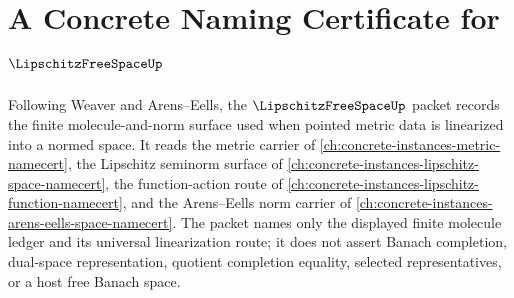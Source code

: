\chapter{A Concrete Naming Certificate for $\LipschitzFreeSpaceUp$}
\label{ch:concrete-instances-lipschitz-free-space-namecert}

Following Weaver and Arens--Eells, the $\LipschitzFreeSpaceUp$ packet records the finite molecule-and-norm surface used when pointed metric data is linearized into a normed space. It reads the metric carrier of \autoref{ch:concrete-instances-metric-namecert}, the Lipschitz seminorm surface of \autoref{ch:concrete-instances-lipschitz-space-namecert}, the function-action route of \autoref{ch:concrete-instances-lipschitz-function-namecert}, and the Arens--Eells norm carrier of \autoref{ch:concrete-instances-arens-eells-space-namecert}. The packet names only the displayed finite molecule ledger and its universal linearization route; it does not assert Banach completion, dual-space representation, quotient completion equality, selected representatives, or a host free Banach space.

